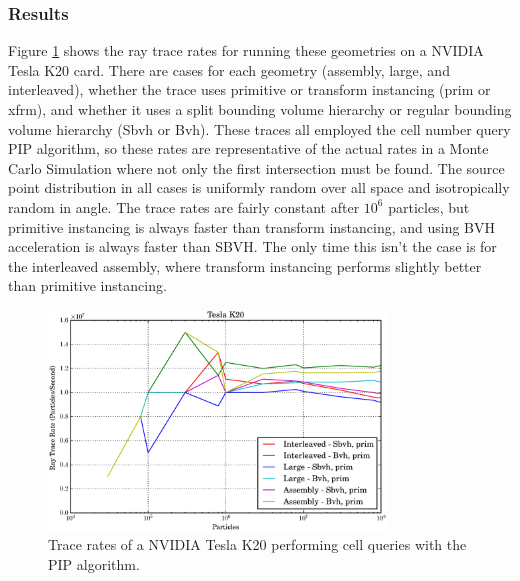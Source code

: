 \subsubsection{Results}

Figure \ref{prelim_optix_k20} shows the ray trace rates for running these geometries on a NVIDIA Tesla K20 card.  There are cases for each geometry (assembly, large, and interleaved), whether the trace uses primitive or transform instancing (prim or xfrm), and whether it uses a split bounding volume hierarchy or regular bounding volume hierarchy (Sbvh or Bvh).  These traces all employed the cell number query PIP algorithm, so these rates are representative of the actual rates in a Monte Carlo Simulation where not only the first intersection must be found.  The source point distribution in all cases is uniformly random over all space and isotropically random in angle.  The trace rates are fairly constant after $10^6$ particles, but primitive instancing is always faster than transform instancing, and using BVH acceleration is always faster than SBVH.   The only time this isn't the case is for the interleaved assembly, where transform instancing performs slightly better than primitive instancing.  

\begin{figure}[h!] 
  \centering
    \includegraphics[width=0.8\textwidth]{graphics/prelim_optix_k20.eps}
     \caption{Trace rates of a NVIDIA Tesla K20 performing cell queries with the PIP algorithm. \label{prelim_optix_k20} }
\end{figure}

